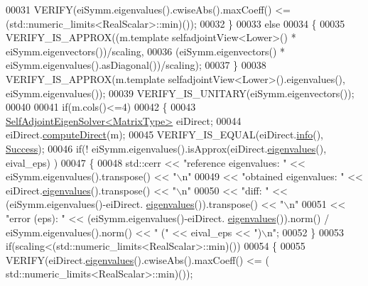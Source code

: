 \begin{DoxyCode}
00031     VERIFY(eiSymm.eigenvalues().cwiseAbs().maxCoeff() <= (std::numeric\_limits<RealScalar>::min)());
00032   \}
00033   \textcolor{keywordflow}{else}
00034   \{
00035     VERIFY\_IS\_APPROX((m.template selfadjointView<Lower>() * eiSymm.eigenvectors())/scaling,
00036                      (eiSymm.eigenvectors() * eiSymm.eigenvalues().asDiagonal())/scaling);
00037   \}
00038   VERIFY\_IS\_APPROX(m.template selfadjointView<Lower>().eigenvalues(), eiSymm.eigenvalues());
00039   VERIFY\_IS\_UNITARY(eiSymm.eigenvectors());
00040 
00041   \textcolor{keywordflow}{if}(m.cols()<=4)
00042   \{
00043     \hyperlink{group___eigenvalues___module_class_eigen_1_1_self_adjoint_eigen_solver}{SelfAdjointEigenSolver<MatrixType>} eiDirect;
00044     eiDirect.\hyperlink{group___eigenvalues___module_a40b0a68841d6176b1ab98743cc82bef4}{computeDirect}(m);  
00045     VERIFY\_IS\_EQUAL(eiDirect.\hyperlink{group___eigenvalues___module_a56bd59b85a6f6f00ff7bff307ad0e015}{info}(), \hyperlink{group__enums_gga85fad7b87587764e5cf6b513a9e0ee5ea52581b035f4b59c203b8ff999ef5fcea}{Success});
00046     \textcolor{keywordflow}{if}(! eiSymm.eigenvalues().isApprox(eiDirect.\hyperlink{group___eigenvalues___module_a8efab27e82aa6aa0ae0c64739238c2e0}{eigenvalues}(), eival\_eps) )
00047     \{
00048       std::cerr << \textcolor{stringliteral}{"reference eigenvalues: "} << eiSymm.eigenvalues().transpose() << \textcolor{stringliteral}{"\(\backslash\)n"}
00049                 << \textcolor{stringliteral}{"obtained eigenvalues:  "} << eiDirect.\hyperlink{group___eigenvalues___module_a8efab27e82aa6aa0ae0c64739238c2e0}{eigenvalues}().transpose() << \textcolor{stringliteral}{"\(\backslash\)n"}
00050                 << \textcolor{stringliteral}{"diff:                  "} << (eiSymm.eigenvalues()-eiDirect.
      \hyperlink{group___eigenvalues___module_a8efab27e82aa6aa0ae0c64739238c2e0}{eigenvalues}()).transpose() << \textcolor{stringliteral}{"\(\backslash\)n"}
00051                 << \textcolor{stringliteral}{"error (eps):           "} << (eiSymm.eigenvalues()-eiDirect.
      \hyperlink{group___eigenvalues___module_a8efab27e82aa6aa0ae0c64739238c2e0}{eigenvalues}()).norm() / eiSymm.eigenvalues().norm() << \textcolor{stringliteral}{"  ("} << eival\_eps << \textcolor{stringliteral}{")\(\backslash\)n"};
00052     \}
00053     \textcolor{keywordflow}{if}(scaling<(std::numeric\_limits<RealScalar>::min)())
00054     \{
00055       VERIFY(eiDirect.\hyperlink{group___eigenvalues___module_a8efab27e82aa6aa0ae0c64739238c2e0}{eigenvalues}().cwiseAbs().maxCoeff() <= (
      std::numeric\_limits<RealScalar>::min)());

\end{DoxyCode}
